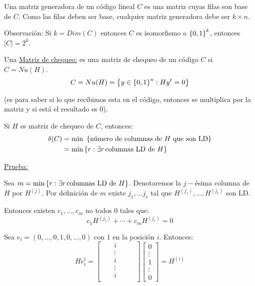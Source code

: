 \documentclass[12pt,a4paper]{article}
\begin{document}
Una matriz generadora de un código lineal $C$ es una matriz cuyas filas son base de $C$. 
Como las filas deben ser base, cualquier matriz generadora debe ser $k\times n$.
\medskip

Observación: Si $k=Dim(C)$ entonces $C$ es isomorfismo a $\left\lbrace 0,1 \right\rbrace^{k}$, entonces 
$|C| = 2^{k}$.
\medskip

\begin{definition}
Una \underline{Matriz de chequeo:} es una matriz de chequeo de un código $C$ si 
$C = Nu(H)$.
$$C = Nu(H) = \left\lbrace y\in \left\lbrace 0,1 \right\rbrace^{n}: Hy^{t} = 0 \right\rbrace$$
\end{definition}

(es para saber si lo que recibimos esta en el código, entonces se multiplica por 
la matriz y si está el resultado es 0).

\begin{teorema} Si $H$ es matriz de chequeo de $C$, entonces:
    \begin{align*}
        \delta(C) &= \min\,\,\left\lbrace \text{número de columnas de $H$ que son LD} \right\rbrace\\
        &= \min \left\lbrace r: \exists r\,\text{columnas LD de $H$} \right\rbrace
    \end{align*}
\end{teorema}

\underline{Prueba:}
\medskip

Sea $m = \min \left\lbrace r: \exists r\,\text{columnas LD de $H$} \right\rbrace$. Denotaremos la 
$j-$ésima columna de $H$ por $H^{(j)}$. Por definición de $m$ existe 
$j_{1},\ldots j_{r}$ tal que $H^{(j_{1})},\ldots, H^{(j_{r})}$ son LD.
\medskip

Entonces existen $c_{1},\ldots, c_{m}$ no todos $0$ tales que:
$$c_{1}H^{(j_{1})} + \cdots + c_{m}H^{(j_{r})} = 0$$

Sea $e_{i} = (0,\ldots,0,1,0,\ldots,0)$ con $1$ en la posición $i$. Entonces:
\begin{equation*}
    He_{i}^{t} =
    \begin{bmatrix}
        &   & i      &   &   & \\
        &   & \vdots &   &   & \\
        &   & i      &   &   & \\
        &   & \vdots &   &   & \\
        &   & i      &   &   & \\
    \end{bmatrix}
    \begin{bmatrix}
        0\\
        \vdots\\
        1\\
        \vdots\\
        0
    \end{bmatrix}
    =
    H^{(i)}
\end{equation*}
\end{document}
